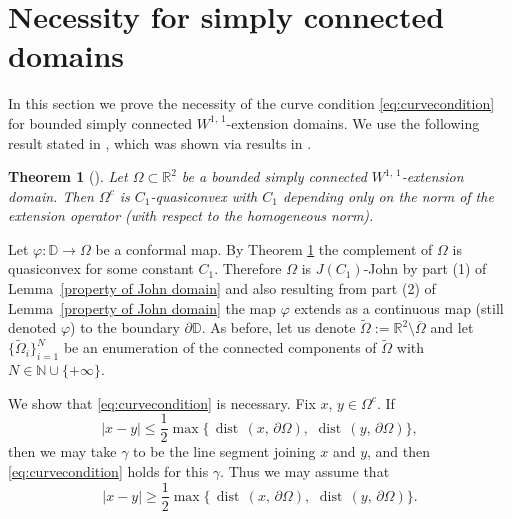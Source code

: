 \documentclass[reqno,11pt]{amsart}
\def\rr{{\mathbb R}}
\def\dist{{\mathop\mathrm{\,dist\,}}}
\newtheorem{thm}{Theorem}[section]
\numberwithin{equation}{section}
\theoremstyle{remark}
\begin{document}
\section{Necessity for simply connected domains}\label{sec:necessity}

In this section we prove the necessity of the curve condition \eqref{eq:curvecondition} for  bounded simply connected
$W^{1,\,1}$-extension domains. 
We use the following result stated in \cite[Corollary 1.2]{kosmirsha10}, which was shown via results in \cite{BM1967}.

\begin{thm}[{\cite[Corollary 1.2]{kosmirsha10}}]\label{thm:quasiconvex}
 Let $\Omega \subset \rr^2$ be a bounded simply connected $W^{1,\,1}$-extension 
domain. Then
 $\Omega^c$ is $C_1$-quasiconvex with $C_1$ depending only on the norm of the extension operator (with respect to the homogeneous norm).
\end{thm}

Let $\varphi \colon \mathbb{D} \to \Omega$ be a conformal map. 
By Theorem \ref{thm:quasiconvex}
the complement of $\Omega$ is quasiconvex for some constant $C_1.$ 
Therefore $\Omega$ is $J(C_1)$-John  by part (1) of Lemma~\ref{property of John domain}  and also resulting from part (2) of
Lemma~\ref{property of John domain} the map $\varphi$ extends as a
continuous map (still denoted  $\varphi$) to the boundary $\partial \mathbb D$.
As before, let us denote $\widetilde\Omega := \rr^2 \setminus\overline{\Omega}$
and let $\{\widetilde\Omega_i\}_{i=1}^N$ be an enumeration of the connected components of 
$\widetilde\Omega$ with $N\in \mathbb N \cup\{+\infty\}$.

We show that \eqref{eq:curvecondition}  is necessary. Fix $x,\,y\in \Omega^c$. If
$$|x-y|\le \frac 1 2 \max\{\dist(x,\,\partial \Omega),\,\dist(y,\,\partial \Omega)\},$$
then we may take $\gamma$ to be the line segment joining $x$ and $y$, and then \eqref{eq:curvecondition} holds for this $\gamma$. Thus we may assume that
$$|x-y|\ge \frac 1 2 \max\{\dist(x,\,\partial \Omega),\,\dist(y,\,\partial \Omega)\}. $$
\end{document}
